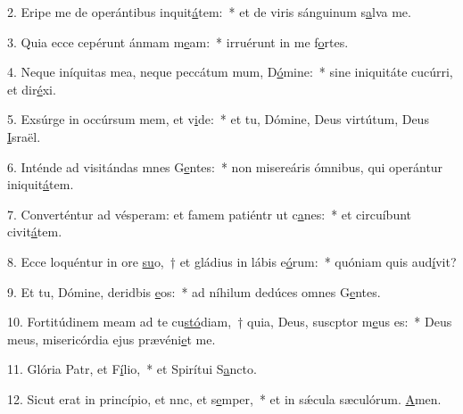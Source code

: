 2. Eripe me de operántibus inquit\uline{á}tem:~* et de viris sánguinum s\uline{a}lva me.\par 
3. Quia ecce cepérunt ánmam m\uline{e}am:~* irruérunt in me f\uline{o}rtes.\par 
4. Neque iníquitas mea, neque peccátum mum, D\uline{ó}mine:~* sine iniquitáte cucúrri, et dir\uline{é}xi.\par 
5. Exsúrge in occúrsum mem, et v\uline{i}de:~* et tu, Dómine, Deus virtútum, Deus \uline{I}sraël.\par 
6. Inténde ad visitándas mnes G\uline{e}ntes:~* non misereáris ómnibus, qui operántur iniquit\uline{á}tem.\par 
7. Converténtur ad vésperam: et famem patiéntr ut c\uline{a}nes:~* et circuíbunt civit\uline{á}tem.\par 
8. Ecce loquéntur in ore \uline{su}o,~† et gládius in lábis e\uline{ó}rum:~* quóniam quis aud\uline{í}vit?\par 
9. Et tu, Dómine, deridbis \uline{e}os:~* ad níhilum dedúces omnes G\uline{e}ntes.\par 
10. Fortitúdinem meam ad te cu\uline{stó}diam,~† quia, Deus, suscptor m\uline{e}us es:~* Deus meus, misericórdia ejus prævéni\uline{e}t me.\par 
11. Glória Patr, et F\uline{í}lio,~* et Spirítui S\uline{a}ncto.\par 
12. Sicut erat in princípio, et nnc, et s\uline{e}mper,~* et in sǽcula sæculórum. \uline{A}men.\par 
